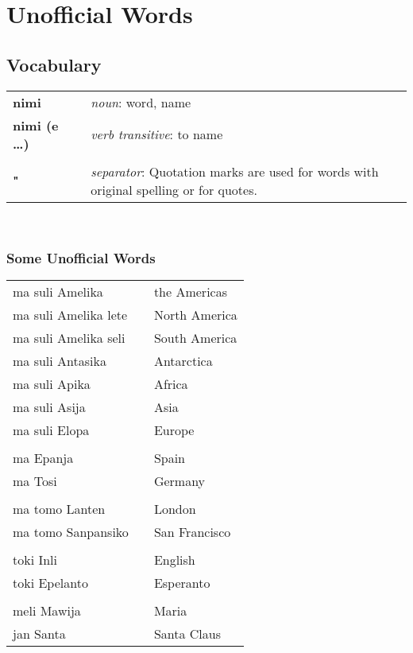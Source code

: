 \section{Unofficial Words} 
%
\subsection*{Vocabulary}
%
\begin{supertabular}{p{2,5cm}|ll}
%
\textbf{nimi} && \textit{noun}: word, name \\ %
\textbf{nimi (e \dots )} && \textit{verb transitive}: to name \\ %
 && \\ %
%
\textbf{"} && \textit{separator}: Quotation marks are used for words with original spelling or for quotes. \\ %
\end{supertabular} \\

\subsubsection*{Some Unofficial Words}

\begin{supertabular}{p{2,5cm}|ll}
ma suli Amelika && the Americas \\
ma suli Amelika lete && North America \\
ma suli Amelika seli && South America \\
ma suli Antasika && Antarctica \\
ma suli Apika && Africa \\
ma suli Asija && Asia \\
ma suli Elopa && Europe \\
 && \\ %
ma Epanja && Spain \\
ma Tosi && Germany \\
 && \\ %
ma tomo Lanten && London \\ 
ma tomo Sanpansiko && San Francisco \\
 && \\ %
toki Inli  && English \\
toki Epelanto && Esperanto \\
 && \\ %
meli Mawija && Maria \\
jan Santa && Santa Claus \\
\end{supertabular}
%
%
\newpage
%

